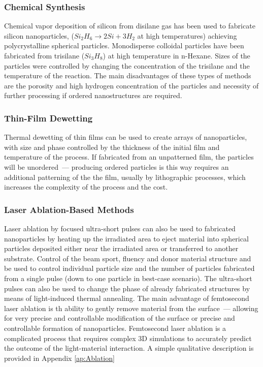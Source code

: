         \subsubsection{Chemical Synthesis}
                Chemical vapor deposition of silicon from disilane gas has been used to fabricate silicon nanoparticles, ($Si_2H_6 \rightarrow 2Si + 3H_2$ at
            high temperatures) achieving polycrystalline spherical particles\cite{shi2012new}. Monodisperse colloidal particles have been fabricated from trisilane ($Si_3H_8$)
            at high temperature in n-Hexane\cite{shi2013monodisperse}. Sizes of the particles were controlled by changing the concentration of the trisilane and the temperature of the
            reaction. The main disadvantages of these types of methods are the porosity and high hydrogen concentration of the particles and necessity of
            further processing if ordered nanostructures are required.

        \subsubsection{Thin-Film Dewetting}
                Thermal dewetting of thin films can be used to create arrays of nanoparticles, with size and phase controlled by the thickness of the initial
            film and temperature of the process\cite{abbarchi2014wafer}. If fabricated from an unpatterned film, the particles will be unordered~--- producing ordered particles is this
            way requires an additional patterning of the the film, usually by lithographic processes, which increases the complexity of the process and the cost.

        \subsubsection{Laser Ablation-Based Methods}
                Laser ablation by focused ultra-short pulses can also be used to fabricated nanoparticles by heating up the irradiated area to eject material into
            spherical particles deposited either near the irradiated area\cite{kuznetsov2012magnetic} or transferred to another substrate\cite{zywietz2014laser}. Control of the beam sport, fluency and donor material
            structure and be used to control individual particle size and the number of particles fabricated from a single pulse (down to one particle in best-case
            scenario). The ultra-short pulses can also be used to change the phase of already fabricated structures by means of light-induced thermal annealing.
                The main advantage of femtosecond laser ablation is th ability to gently remove material from the surface~--- allowing for very precise and controllable
            modification of the surface or precise and controllable formation of nanoparticles. Femtosecond laser ablation is a complicated process that requires
            complex 3D simulations to accurately predict the outcome of the light-material interaction. A simple qualitative description is provided in Appendix \ref{ap:Ablation}

